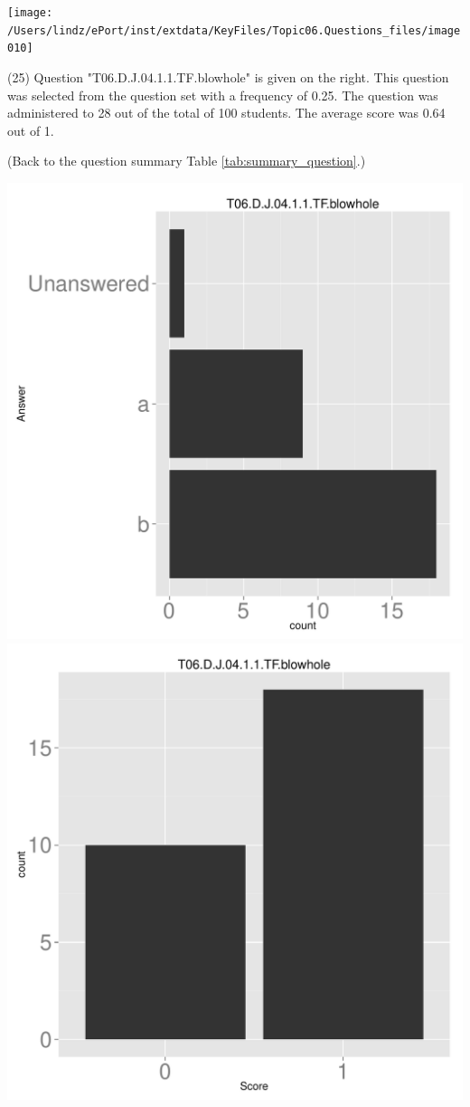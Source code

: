 \documentclass[12pt,nohyper]{tufte-handout}\usepackage[]{graphicx}\usepackage[]{color}
\begin{document}
\vspace{6cm}\begin{marginfigure}\texttt{[image: /Users/lindz/ePort/inst/extdata/KeyFiles/Topic06.Questions\_files/image010]}\end{marginfigure}\vspace{-6cm} (25) Question "T06.D.J.04.1.1.TF.blowhole" is given on the right. This question was selected from the question set with a frequency of 0.25. The question was administered to 28 out of the total of 100 students. The average score was 0.64 out of 1.

 (Back to the question summary Table \ref{tab:summary_question}.)

\begin{center} \includegraphics[width=.45\linewidth]{Topic06_25_answer} \includegraphics[width=.45\linewidth]{Topic06_25_score} \end{center} 
\end{document}
